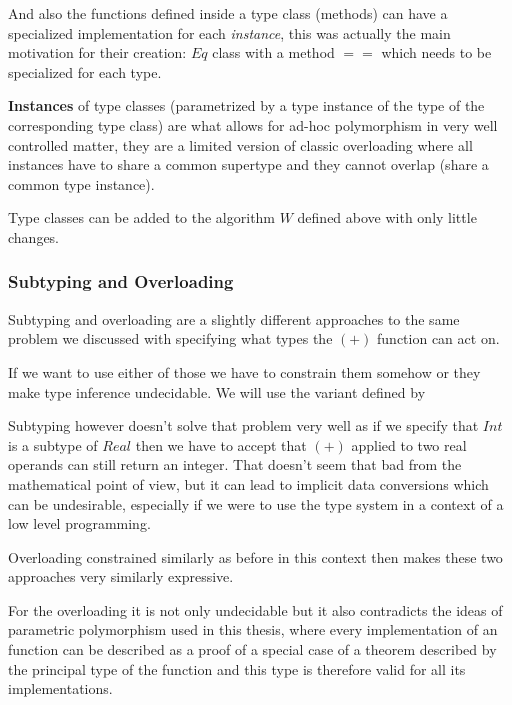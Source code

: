 And also the functions defined inside a type class (methods) can have a specialized implementation for each \emph{instance}, this was actually the main motivation for their creation: $Eq$ class with a method $==$ which needs to be specialized for each type. %

\textbf{Instances} of type classes (parametrized by a type instance of the type of the corresponding type class) are what allows for ad-hoc polymorphism %
in very well controlled matter, they are a limited version of classic overloading where all instances have to share a common supertype and they cannot overlap (share a common type instance).

Type classes can be added to the algorithm $W$ defined above with only little changes. %

\subsubsection{Subtyping and Overloading}


Subtyping and overloading are a slightly different approaches to the same problem we discussed with specifying what types the $(+)$ function can act on.

If we want to use either of those we have to constrain them somehow or they make type inference undecidable. We will use the variant defined by %

Subtyping however doesn't solve that problem very well as if we specify that $Int$ is a subtype of $Real$ then we have to accept that $(+)$ applied to two real operands can still return an integer. That doesn't seem that bad from the mathematical point of view, but it can lead to implicit data conversions which can be undesirable, especially if we were to use the type system in a context of a low level programming. %

Overloading constrained similarly as before in this context then makes these two approaches very similarly expressive. %

For the overloading it is not only undecidable but it also contradicts the ideas of parametric polymorphism used in this thesis, where every implementation of an function can be described as a proof of a special case of a theorem described by the principal type of the function and this type is therefore valid for all its implementations. %

